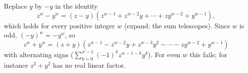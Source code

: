 Replace $y$ by $-y$ in the identity
\[
z^w-y^w=(z-y)\left(z^{w-1}+z^{w-2}y+\cdots+zy^{w-2}+y^{w-1}\right),
\]
which holds for every positive integer $w$ (expand: the sum telescopes). Since $w$ is odd, $(-y)^w=-y^w$, so
\[
\boxed{z^w+y^w=(z+y)\left(z^{w-1}-z^{w-2}y+z^{w-3}y^2-\cdots-zy^{w-2}+y^{w-1}\right)}
\]
with alternating signs ($\sum_{k=0}^{w-1}(-1)^kz^{w-1-k}y^k$). For even $w$ this fails; for instance $z^2+y^2$ has no real linear factor.
